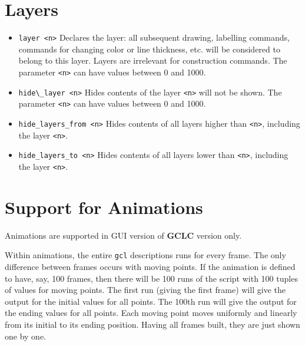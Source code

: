 \documentclass[a4paper]{book}
\newcommand{\gclc}{{\bfseries GCLC}\xspace}
\begin{document}
\section{Layers}
\label{subsec:layers}


\begin{itemize}
\item \verb|layer <n>|
        Declares the layer: all subsequent drawing, labelling commands,
        commands for changing color or line thickness, etc. will be
        considered to belong to this layer. Layers are irrelevant for
        construction commands. The parameter \verb|<n>| can have values
        between 0 and 1000.

\item \verb|hide\_layer <n>|
        Hides contents of the layer \verb|<n>| will not be shown.
        The parameter \verb|<n>| can have values between 0 and 1000.

\item \verb|hide_layers_from <n>|
        Hides contents of all layers higher than \verb|<n>|, including
        the layer \verb|<n>|.

\item \verb|hide_layers_to <n>|
        Hides contents of all layers lower than \verb|<n>|, including
        the layer \verb|<n>|.
\end{itemize}




\section{Support for Animations}
\label{subsec:animations}

Animations are supported in GUI version of \gclc version only.

Within animations, the entire \verb|gcl| descriptions runs for
every frame. The only difference between frames occurs with moving
points. If the animation is defined to have, say, 100 frames,
then there will be 100 runs of the script with 100 tuples of
values for moving points. The first run (giving the first frame)
will give the output for the initial values for all points. The 100th
run will give the output for the ending values for all points.
Each moving point moves uniformly and linearly from its initial
to its ending position. Having all frames built, they are just
shown one by one.
\end{document}

